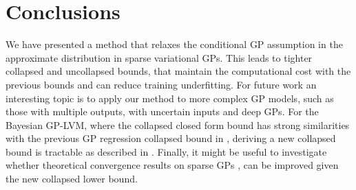 \vspace{-1mm}

\section{Conclusions
\label{sec:conclusions}
}
\vspace{-1mm} 

We have presented a method that relaxes the conditional GP assumption in the approximate 
distribution in sparse variational GPs.
This leads to tighter collapsed and uncollapsed bounds, that maintain the computational cost with the previous bounds and can reduce training underfitting. For future work 
an interesting topic is to apply our method to more complex GP models, 
such as those with multiple outputs, with uncertain inputs and deep GPs. 
For the Bayesian GP-LVM, where the collapsed closed form bound has strong
similarities with the previous GP regression collapsed bound in , deriving  
a new collapsed bound is tractable as described in . 
Finally, it might be useful to investigate whether theoretical convergence results on sparse GPs
\cite{burt2020convergence,wild2023etal}, can be improved given the new collapsed lower bound.   





 










